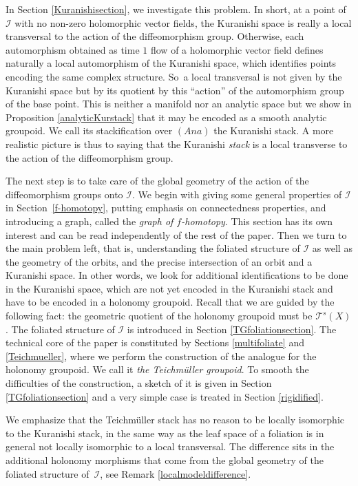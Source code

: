 \documentclass[JEP,XML,SOM,Unicode]{cedram}
\let\mathcal\mathscr
\newcommand{\Ana}{\mathit{Ana}}
\theoremstyle{plain}
\theoremstyle{definition}
\theoremstyle{remark}
\numberwithin{equation}{section}
\newcommand{\cI}{\mathcal{I}}
\begin{document}
In Section \ref{Kuranishisection}, we investigate this problem. In short, at a point of $\cI$ with no non-zero holomorphic vector fields, the Kuranishi space is really a local transversal to the action of the diffeomorphism group. Otherwise, each automorphism obtained as time $1$ flow of a holomorphic vector field defines naturally a local automorphism of the Kuranishi space, which identifies points encoding the same complex structure. So~a local transversal is not given by the Kuranishi space but by its quotient by this ``action'' of the automorphism group of the base point. This is neither a manifold nor an analytic space but we show in Proposition \ref{analyticKurstack} that it may be encoded as a smooth analytic groupoid. We call its stackification over $(\Ana)$ the Kuranishi stack. A more realistic picture is thus to saying that the Kuranishi \emph{stack} is a local transverse to the action of the diffeomorphism group.

The next step is to take care of the global geometry of the action of the diffeomorphism groups onto $\cI$. We begin with giving some general properties of $\cI$ in Section~\ref{f-homotopy}, putting emphasis on connectedness properties, and introducing a graph, called the \emph{graph of $f$-homotopy}. This section has its own interest and can be read independently of the rest of the paper. Then we turn to the main problem left, that is, understanding the foliated structure of $\cI$ as well as the geometry of the orbits, and the precise intersection of an orbit and a Kuranishi space. In other words, we look for additional identifications to be done in the Kuranishi space, which are not yet encoded in the Kuranishi stack and have to be encoded in a holonomy groupoid. Recall that we are guided by the following fact: the geometric quotient of the holonomy groupoid must be $\mathcal T^s(X)$. The foliated structure of $\cI$ is introduced in Section \ref{TGfoliationsection}. The technical core of the paper is constituted by Sections \ref{multifoliate} and \ref{Teichmueller}, where we perform the construction of the analogue for the holonomy groupoid. We call it \emph{the Teichmüller groupoid}. To smooth the difficulties of the construction, a sketch of it is given in Section \ref{TGfoliationsection} and a very simple case is treated in Section \ref{rigidified}.\enlargethispage{.5\baselineskip}%

We emphasize that the Teichmüller stack has no reason to be locally isomorphic to the Kuranishi stack, in the same way as the leaf space of a foliation is in general not locally isomorphic to a local transversal. The difference sits in the additional holonomy morphisms that come from the global geometry of the foliated structure of~$\cI$, see Remark \ref{localmodeldifference}.
\end{document}
